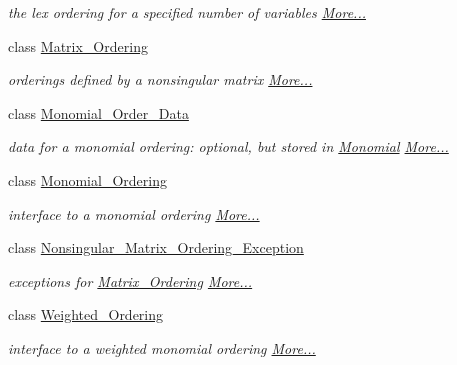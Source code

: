 \begin{DoxyCompactItemize}
\begin{DoxyCompactList}\small\item\em the lex ordering for a specified number of variables  \hyperlink{group__orderinggroup_class_lex___ordering}{More...}\end{DoxyCompactList}\item 
class \hyperlink{group__orderinggroup_class_matrix___ordering}{Matrix\+\_\+\+Ordering}
\begin{DoxyCompactList}\small\item\em orderings defined by a nonsingular matrix  \hyperlink{group__orderinggroup_class_matrix___ordering}{More...}\end{DoxyCompactList}\item 
class \hyperlink{group__orderinggroup_class_monomial___order___data}{Monomial\+\_\+\+Order\+\_\+\+Data}
\begin{DoxyCompactList}\small\item\em data for a monomial ordering\+: optional, but stored in {\ttfamily \hyperlink{group__polygroup_class_monomial}{Monomial}}  \hyperlink{group__orderinggroup_class_monomial___order___data}{More...}\end{DoxyCompactList}\item 
class \hyperlink{group__orderinggroup_class_monomial___ordering}{Monomial\+\_\+\+Ordering}
\begin{DoxyCompactList}\small\item\em interface to a monomial ordering  \hyperlink{group__orderinggroup_class_monomial___ordering}{More...}\end{DoxyCompactList}\item 
class \hyperlink{group__orderinggroup_class_nonsingular___matrix___ordering___exception}{Nonsingular\+\_\+\+Matrix\+\_\+\+Ordering\+\_\+\+Exception}
\begin{DoxyCompactList}\small\item\em exceptions for \hyperlink{group__orderinggroup_class_matrix___ordering}{Matrix\+\_\+\+Ordering}  \hyperlink{group__orderinggroup_class_nonsingular___matrix___ordering___exception}{More...}\end{DoxyCompactList}\item 
class \hyperlink{group__orderinggroup_class_weighted___ordering}{Weighted\+\_\+\+Ordering}
\begin{DoxyCompactList}\small\item\em interface to a weighted monomial ordering  \hyperlink{group__orderinggroup_class_weighted___ordering}{More...}\end{DoxyCompactList}\item 

\end{DoxyCompactItemize}
